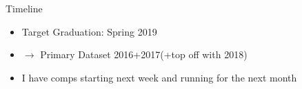 \begin{frame}{Timeline}
  \begin{itemize}
    \item Target Graduation: Spring 2019
    \item $\rightarrow$ Primary Dataset 2016+2017(+top off with 2018)
    \item I have comps starting next week and running for the next month
  \end{itemize}
\end{frame}
